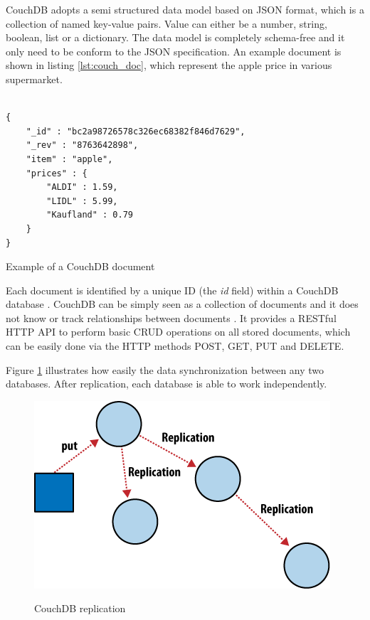 CouchDB adopts a semi structured data model based on JSON format, which is a collection of named key-value pairs. Value can either be a number, string, boolean, list or a dictionary. The data model is completely schema-free and it only need to be conform to the JSON specification. An example document is shown in listing \ref{lst:couch_doc}, which represent the apple price in various supermarket. 
\\
\\
\begin{code}
\begin{verbatim}
{
    "_id" : "bc2a98726578c326ec68382f846d7629",
    "_rev" : "8763642898",
    "item" : "apple",
    "prices" : {
        "ALDI" : 1.59,
        "LIDL" : 5.99,
        "Kaufland" : 0.79
    }
}
\end{verbatim}
\caption{Example of a CouchDB document}
\label{lst:couch_doc}
\end{code}

Each document is identified by a unique ID (the \textit{id} field) within a CouchDB database . CouchDB can be simply seen as a collection of documents and it does not know or track relationships between documents \cite{books/daglib/0024051}.  It provides a RESTful HTTP API to perform basic CRUD operations on all stored documents, which can be easily done via the HTTP methods POST, GET, PUT and DELETE.

Figure \ref{fig:couchdb_repl} illustrates how easily the data synchronization between any two databases. After replication, each database is able to work independently.

\begin{figure}[htb]
  \centering
  \includegraphics{couchdb_repl.png}\\
  \caption{CouchDB replication}
  \label{fig:couchdb_repl}
  \protect\cite{couchdb_cons}
\end{figure}

